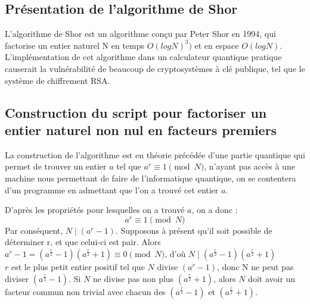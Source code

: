 \documentclass[12pt]{article}
\begin{document}
\subsection{Présentation de l'algorithme de Shor}
L'algorithme de Shor est un algorithme conçu par Peter Shor en 1994, qui factorise un entier naturel N en temps $O(log N)^3)$ et en espace $O(log N)$.
L'implémentation de cet algorithme dans un calculateur quantique pratique causerait la vulnérabilité de beaucoup de cryptosystèmes à clé publique, tel que le système de chiffrement RSA.

\subsection{Construction du script pour factoriser un entier naturel non nul en facteurs premiers}
La construction de l'algorithme est en théorie précédée d'une partie quantique qui permet de trouver un entier $a$ tel que $a^r \equiv 1 \pmod N$, n'ayant pas accès à une machine nous permettant de faire de l'informatique quantique, on se contentera d'un programme en admettant que l'on a trouvé cet entier $a$.

D'après les propriétés pour lesquelles on a trouvé $a$, on a donc :
$$a^r \equiv 1 \pmod N$$
Par conséquent, $N \mid (a^r -1)$. Supposons à présent qu'il soit possible de déterminer r, et que celui-ci est pair. Alors
\\
$a^r -1 = (a^{\frac{r}{2}} -1)(a^{\frac{r}{2}}+1) \equiv 0 \pmod N$, d'où $N \mid (a^{\frac{r}{2}} -1)(a^{\frac{r}{2}}+1)$
\\
$r$ est le plus petit entier positif tel que $N$ divise $(a^r -1)$, donc N ne peut pas diviser $(a^{\frac{r}{2}}-1)$. Si $N$ ne divise pas non plus $(a^{\frac{r}{2}}+1)$, alors $N$ doit avoir un facteur commun non trivial avec chacun des $(a^{\frac{r}{2}}-1)$ et $(a^{\frac{r}{2}}+1)$.
\end{document}
